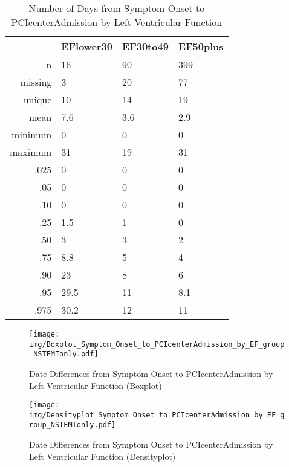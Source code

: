\documentclass[a4paper]{report}
\begin{document}
\begin{itemize}
{%
\begin{table}[ht]
\centering
\begin{tabular}{rlll}
  \toprule
 & EFlower30 & EF30to49 & EF50plus \\ 
  \midrule
n & 16 & 90 & 399 \\ 
  missing & 3 & 20 & 77 \\ 
  unique & 10 & 14 & 19 \\ 
  mean & 7.6 & 3.6 & 2.9 \\ 
  minimum & 0 & 0 & 0 \\ 
  maximum & 31 & 19 & 31 \\ 
  .025 & 0 & 0 & 0 \\ 
  .05 & 0 & 0 & 0 \\ 
  .10 & 0 & 0 & 0 \\ 
  .25 & 1.5 & 1 & 0 \\ 
  .50 & 3 & 3 & 2 \\ 
  .75 & 8.8 & 5 & 4 \\ 
  .90 & 23 & 8 & 6 \\ 
  .95 & 29.5 & 11 & 8.1 \\ 
  .975 & 30.2 & 12 & 11 \\ 
   \bottomrule
\end{tabular}
\caption{Number of Days from Symptom Onset to PCIcenterAdmission by Left Ventricular Function} 
\end{table}
\begin{figure}
  \centering
  \caption{Date Differences from Symptom Onset to PCIcenterAdmission by Left Ventricular Function (Boxplot)}
  \label{Boxplot: Date Differences from Symptom Onset to PCIcenterAdmission by Left Ventricular Function}
\texttt{[image: img/Boxplot\_Symptom\_Onset\_to\_PCIcenterAdmission\_by\_EF\_group\_NSTEMIonly.pdf]}\end{figure}


\begin{figure}
  \centering
  \caption{Date Differences from Symptom Onset to PCIcenterAdmission by Left Ventricular Function (Densityplot)}
  \label{Density: Date Differences from Symptom Onset to PCIcenterAdmission by Left Ventricular Function}
\texttt{[image: img/Densityplot\_Symptom\_Onset\_to\_PCIcenterAdmission\_by\_EF\_group\_NSTEMIonly.pdf]}\end{figure}


\clearpage

}
\end{itemize}
\end{document}
